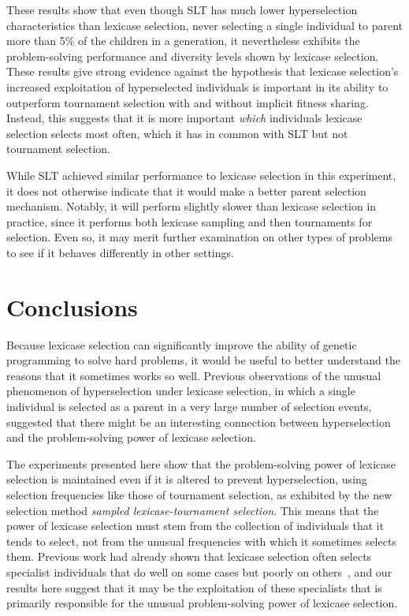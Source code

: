 \documentclass{sig-alternate}
\begin{document}
These results show that even though SLT has much lower hyperselection characteristics than lexicase selection, never selecting a single individual to parent more than 5\% of the children in a generation, it nevertheless exhibits the problem-solving performance and diversity levels shown by lexicase selection. These results give strong evidence against the hypothesis that lexicase selection's increased exploitation of hyperselected individuals is important in its ability to outperform tournament selection with and without implicit fitness sharing. Instead, this suggests that it is more important \textit{which} individuals lexicase selection selects most often, which it has in common with SLT but not tournament selection.

While SLT achieved similar performance to lexicase selection in this experiment, it does not otherwise indicate that it would make a better parent selection mechanism. Notably, it will perform slightly slower than lexicase selection in practice, since it performs both lexicase sampling and then tournaments for selection. Even so, it may merit further examination on other types of problems to see if it behaves differently in other settings.


\section{Conclusions}
\label{section:conclusions}

Because lexicase selection can significantly improve the ability of genetic programming to solve hard problems, it would be useful to better understand the reasons that it sometimes works so well. Previous observations of the unusual phenomenon of hyperselection under lexicase selection, in which a single individual is selected as a parent in a very large number of selection events, suggested that there might be an interesting connection between hyperselection and the problem-solving power of lexicase selection.

The experiments presented here show that the problem-solving power of lexicase selection is maintained even if it is altered to prevent hyperselection, using selection frequencies like those of tournament selection, as exhibited by the new selection method \textit{sampled lexicase-tournament selection}. This means that the power of lexicase selection must stem from the collection of individuals that it tends to select, not from the unusual frequencies with which it sometimes selects them. Previous work had already shown that lexicase selection often selects specialist individuals that do well on some cases but poorly on others~\cite{Helmuth:2015:GPTP,Helmuth:2015:dissertation}, and our results here suggest that it may be the exploitation of these specialists that is primarily responsible for the unusual problem-solving power of lexicase selection.
\end{document}

